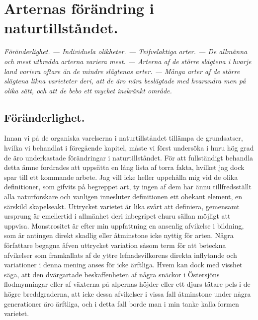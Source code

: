 





\chapter[Naturtillståndet]{Arternas förändring i naturtillståndet.}

{\it
Föränderlighet. — Individuela olikheter. — Tvifvelaktiga arter. — De allmänna och mest utbredda arterna variera mest. — Arterna af de större slägtena i hvarje land variera oftare än de mindre slägtenas arter. — Många arter af de större slägtena likna varieteter deri, att de äro nära beslägtade med hvarandra men på olika sätt, och att de bebo ett mycket inskränkt område.
}


\section{Föränderlighet.}

Innan vi på de organiska varelserna i naturtillståndet tillämpa de grundsatser, hvilka vi behandlat i föregående kapitel, måste vi först undersöka i huru hög grad de äro underkastade förändringar i naturtillståndet. För att fullständigt behandla detta ämne fordrades att uppsätta en lång lista af torra fakta, hvilket jag dock spar till ett kommande arbete. Jag vill icke heller uppehålla mig vid de olika definitioner, som gifvits på begreppet art, ty ingen af dem har ännu tillfredsställt alla naturforskare och vanligen innesluter definitionen ett obekant element, en särskild skapelseakt. Uttrycket varietet är lika svårt att definiera, gemensamt ursprung är emellertid i allmänhet deri inbegripet ehuru sällan möjligt att uppvisa. Monstrositet är efter min uppfattning en ansenlig afvikelse i bildning, som är antingen direkt skadlig eller åtminstone icke nyttig för arten. Några författare begagna äfven uttrycket variation såsom term för att beteckna afvikelser som framkallats af de yttre lefnadsvilkorens direkta inflytande och variationer i denna mening anses för icke ärftliga. Hvem kan dock med visshet säga, att den dvärgartade beskaffenheten af några snäckor i Östersjöns flodmynningar eller af växterna på alpernas höjder eller ett djurs tätare pels i de högre breddgraderna, att icke dessa afvikelser i vissa fall åtminstone under några generationer äro ärftliga, och i detta fall borde man i min tanke kalla formen varietet.

